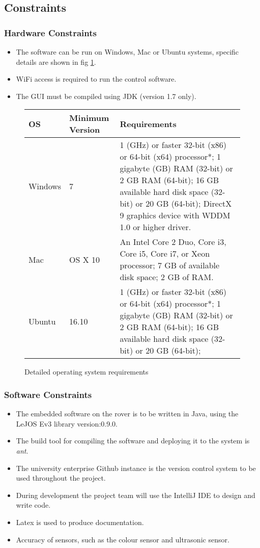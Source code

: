 \subsection{Constraints}
\subsubsection*{Hardware Constraints}
\begin{itemize}
\item The software can be run on Windows, Mac or Ubuntu systems, specific details are shown in fig \ref{fig:tab Os Requirements}. 
\item  WiFi access is required to run the control software. 
\item The GUI must be compiled using JDK (version 1.7 only).
\end{itemize}	

	
\begin{figure}
	\centering
	\begin{tabular}{|p{1.5cm}|p{2cm}|p{7cm}|}
		\hline 
		\textbf{OS} &\textbf{Minimum Version} & \textbf{Requirements} \\ 
		\hline 
		Windows & 7 & 1 (GHz) or faster 32-bit (x86) or 64-bit (x64) processor*;
		1 gigabyte (GB) RAM (32-bit) or 2 GB RAM (64-bit);
		16 GB available hard disk space (32-bit) or 20 GB (64-bit);
		DirectX 9 graphics device with WDDM 1.0 or higher driver. \\ 
		\hline 
		Mac & OS X 10 & An Intel Core 2 Duo, Core i3, Core i5, Core i7, or Xeon processor;
		7 GB of available disk space;
		2 GB of RAM. \\ 
		\hline 
		Ubuntu & 16.10 & 1 (GHz) or faster 32-bit (x86) or 64-bit (x64) processor*;
		1 gigabyte (GB) RAM (32-bit) or 2 GB RAM (64-bit);
		16 GB available hard disk space (32-bit) or 20 GB (64-bit); \\
		\hline 
	\end{tabular} 
	\caption{Detailed operating system requirements}
	\label{fig:tab Os Requirements}
\end{figure}

\subsubsection*{Software Constraints}
\begin{itemize}
\item The embedded software on the rover is to be written in Java, using the LeJOS Ev3 library version:0.9.0.
\item The build tool for compiling the software and deploying it to the system is \textit{ant}.
\item The university enterprise Github instance is the version control system to be used throughout the project.
\item During development the project team will use the IntelliJ IDE to design and write code. 
\item Latex is used to produce documentation.
\item Accuracy of sensors, such as the colour sensor and ultrasonic sensor.
\end{itemize}	



	





